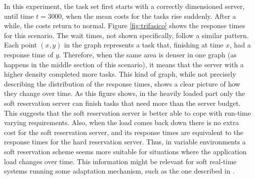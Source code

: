 \documentclass[times, 10pt,twocolumn]{article}
\begin{document}
In this experiment, the task set first starts with a correctly
dimensioned server, until time $t=3000$, when the mean costs for the
tasks rise suddenly. After a while, the costs return to normal. Figure
\ref{fig:trifasico} shows the response times for this scenario. The
wait times, not shown specifically, follow a similar pattern. Each
point $(x,y)$ in the graph represents a task that, finishing at time
$x$, had a response time of $y$. Therefore, when the same area is
denser in one graph (as happens in the middle section of this
scenario), it means that the server with a higher density completed
more tasks. This kind of graph, while not precisely describing the
distribution of the response times, shows a clear picture of how they
change over time. As this figure shows, in the heavily loaded part
only the soft reservation server can finish tasks that need more than
the server budget. This suggests that the soft reservation server is
better able to cope with run-time varying requirements. Also, when the
load comes back down there is no extra cost for the soft reservation
server, and its response times are equivalent to the response times
for the hard reservation server. Thus, in variable environments a soft
reservation scheme seems more suitable for situations where the
application load changes over time. This information might be relevant
for soft real-time systems running some adaptation mechanism, such as
the one described in \cite{abeni.ea05:qos}.
\end{document}
